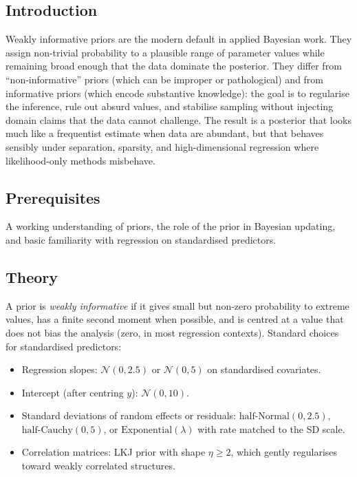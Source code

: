 \documentclass[
]{article}
\author{}
\date{\vspace{-2.5em}}
\providecommand{\tightlist}{%
  \setlength{\itemsep}{0pt}\setlength{\parskip}{0pt}}
\begin{document}
\subsection{Introduction}\label{introduction}

Weakly informative priors are the modern default in applied Bayesian
work. They assign non-trivial probability to a plausible range of
parameter values while remaining broad enough that the data dominate the
posterior. They differ from ``non-informative'' priors (which can be
improper or pathological) and from informative priors (which encode
substantive knowledge): the goal is to regularise the inference, rule
out absurd values, and stabilise sampling without injecting domain
claims that the data cannot challenge. The result is a posterior that
looks much like a frequentist estimate when data are abundant, but that
behaves sensibly under separation, sparsity, and high-dimensional
regression where likelihood-only methods misbehave.

\subsection{Prerequisites}\label{prerequisites}

A working understanding of priors, the role of the prior in Bayesian
updating, and basic familiarity with regression on standardised
predictors.

\subsection{Theory}\label{theory}

A prior is \emph{weakly informative} if it gives small but non-zero
probability to extreme values, has a finite second moment when possible,
and is centred at a value that does not bias the analysis (zero, in most
regression contexts). Standard choices for standardised predictors:

\begin{itemize}
\tightlist
\item
  Regression slopes: \(\mathcal N(0, 2.5)\) or \(\mathcal N(0, 5)\) on
  standardised covariates.
\item
  Intercept (after centring \(y\)): \(\mathcal N(0, 10)\).
\item
  Standard deviations of random effects or residuals:
  \(\mathrm{half\text{-}Normal}(0, 2.5)\),
  \(\mathrm{half\text{-}Cauchy}(0, 5)\), or
  \(\mathrm{Exponential}(\lambda)\) with rate matched to the SD scale.
\item
  Correlation matrices: LKJ prior with shape \(\eta \geq 2\), which
  gently regularises toward weakly correlated structures.
\end{itemize}
\end{document}
